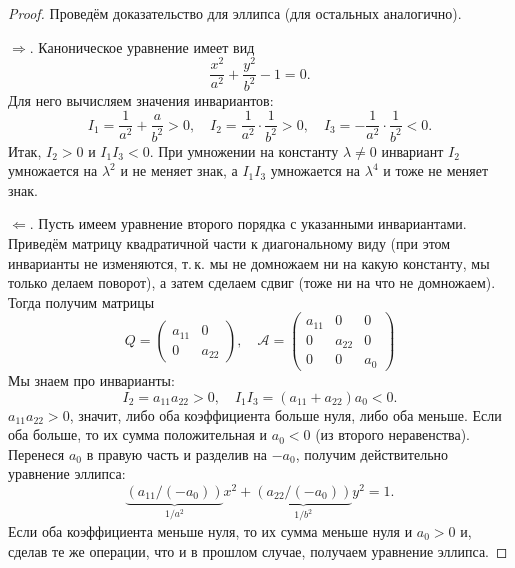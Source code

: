\begin{proof}
    Проведём доказательство для эллипса (для остальных аналогично). 

    $\Rightarrow$. Каноническое уравнение имеет вид
    $$
    \frac{x^2}{a^2} + \frac{y^2}{b^2} - 1 = 0.
    $$
    Для него вычисляем значения инвариантов:
    $$
    I_1 = \frac{1}{a^2} + \frac{a}{b^2} > 0,\quad I_2 = \frac{1}{a^2}\cdot\frac{1}{b^2} > 0,\quad I_3 = -\frac{1}{a^2}\cdot\frac{1}{b^2} < 0.
    $$
    Итак, $I_2 > 0$ и $I_1I_3 < 0$. При умножении на константу $\lambda \ne 0$ инвариант $I_2$ умножается на $\lambda^2$ и не меняет знак, а $I_1I_3$ умножается на $\lambda^4$ и тоже не меняет знак.

    $\Leftarrow$. Пусть имеем уравнение второго порядка с указанными инвариантами. Приведём матрицу квадратичной части к диагональному виду (при этом инварианты не изменяются, т.\,к. мы не домножаем ни на какую константу, мы только делаем поворот), а затем сделаем сдвиг (тоже ни на что не домножаем). Тогда получим матрицы
    $$
    Q = 
    \begin{pmatrix}
        a_{11} & 0\\
        0 & a_{22}
    \end{pmatrix},\quad\mathcal{A} = 
    \begin{pmatrix}
        a_{11} & 0 & 0\\
        0 & a_{22} & 0\\
        0 & 0 & a_0
    \end{pmatrix}
    $$
    Мы знаем про инварианты:
    $$
    I_2 = a_{11}a_{22} > 0,\quad I_1I_3 = (a_{11} + a_{22})a_{0} < 0.
    $$
    $a_{11}a_{22} > 0$, значит, либо оба коэффициента больше нуля, либо оба меньше. Если оба больше, то их сумма положительная и $a_0 < 0$ (из второго неравенства). Перенеся $a_0$ в правую часть и разделив на $-a_0$, получим действительно уравнение эллипса:
    $$
    \underbrace{(a_{11} / (-a_0))}_{1/a^2}x^2 + \underbrace{(a_{22} / (-a_0))}_{1/b^2}y^2 = 1.
    $$
    Если оба коэффициента меньше нуля, то их сумма меньше нуля и $a_0 > 0$ и, сделав те же операции, что и в прошлом случае, получаем уравнение эллипса.
\end{proof}


